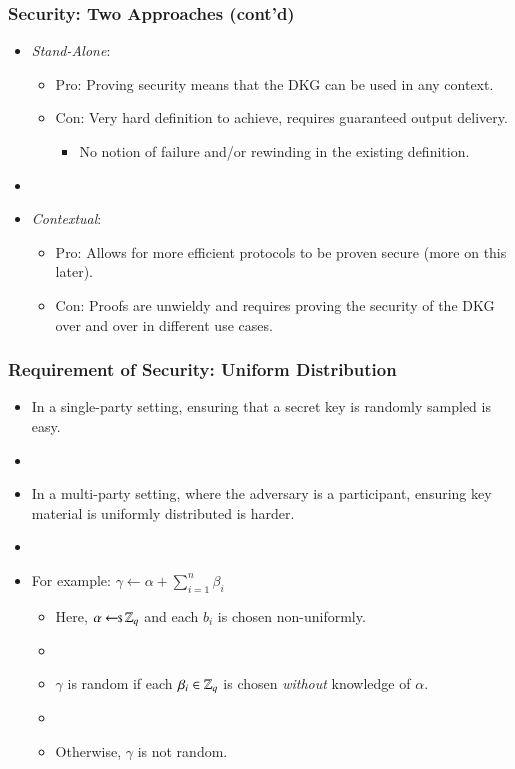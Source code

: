 \documentclass[hyperref={pdfpagelabels=true},table,dvipsnames,14pt,aspectratio=169]{beamer}
\begin{document}
\begin{frame}
  \frametitle{Security: Two Approaches (cont'd)}

  \begin{itemize}
    \item<1-> \emph{Stand-Alone}:
  \begin{itemize}
    \item<2-> Pro: Proving security means that the DKG can be used in any context.
    \item<3-> Con: Very hard definition to achieve, requires guaranteed output delivery.
  \begin{itemize}
    \item<4-> No notion of failure and/or rewinding in the existing definition.
    \end{itemize}
    \end{itemize}
    \item[]
    \item<5-> \emph{Contextual}:
  \begin{itemize}
    \item<6-> Pro: Allows for more efficient protocols to be proven secure (more on this later).
    \item<7-> Con: Proofs are unwieldy and requires proving the security of the DKG over and over in different use cases.
    \end{itemize}
  \end{itemize}
\end{frame}

\begin{frame}
  \frametitle{Requirement of Security: Uniform Distribution}

  \begin{itemize}
    \item<1-> In a single-party setting, ensuring that a secret key is randomly sampled is easy.
    \item[]
    \item<2-> In a multi-party setting, where the adversary is a participant,
      ensuring key material is uniformly distributed is harder.
    \item[]
    \item<3-> For example: $\gamma \gets \alpha + \sum_{i=1}^n \beta_i$
  \begin{itemize}
    \item<4-> Here, $\alpha \hskip2.3pt{\gets\!\!\mbox{\scriptsize${\$}$\normalsize}}\, \mathbb{Z}_q$ and each $b_i$ is chosen non-uniformly.
    \item[]
    \item<5-> $\gamma$ is random if each $\beta_i \in \mathbb{Z}_q$ is chosen \emph{without} knowledge of $\alpha$.
    \item[]
    \item<6-> Otherwise, $\gamma$ is not random.
  \end{itemize}
  \end{itemize}
\end{frame}
\end{document}
